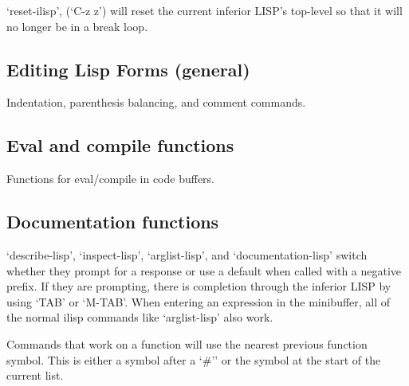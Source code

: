    `reset-ilisp', (`C-z z') will reset the current inferior LISP's
top-level so that it will no longer be in a break loop.



\subsection{Editing Lisp Forms (general)}

Indentation, parenthesis balancing, and comment commands.

\key{close-all-lisp}{]}


\subsection{Eval and compile functions}

Functions for eval/compile in code buffers.  

\key{close-and-send-lisp}{C-]}


\subsection{Documentation functions}

`describe-lisp', `inspect-lisp', `arglist-lisp', and
`documentation-lisp' switch whether they prompt for a response or use a
default when called with a negative prefix. If they are prompting,
there is completion through the inferior LISP by using `TAB' or
`M-TAB'. When entering an expression in the minibuffer, all of the
normal ilisp commands like `arglist-lisp' also work.

   Commands that work on a function will use the nearest previous
function symbol. This is either a symbol after a `\#'' or the symbol at
the start of the current list.

